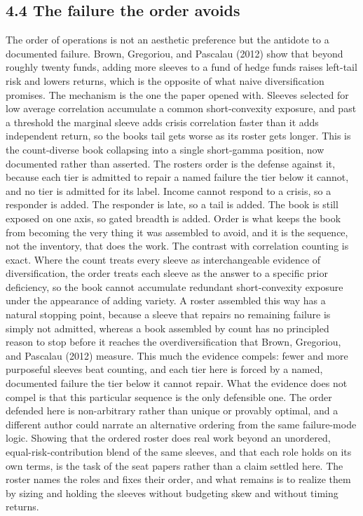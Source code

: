 \documentclass[12pt, a4paper]{article}
\begin{document}
\subsection*{4.4 The failure the order
avoids}\label{the-failure-the-order-avoids}

The order of operations is not an aesthetic preference but the antidote
to a documented failure. Brown, Gregoriou, and Pascalau (2012) show that
beyond roughly twenty funds, adding more sleeves to a fund of hedge
funds raises left-tail risk and lowers returns, which is the opposite of
what naive diversification promises. The mechanism is the one the paper
opened with. Sleeves selected for low average correlation accumulate a
common short-convexity exposure, and past a threshold the marginal
sleeve adds crisis correlation faster than it adds independent return,
so the book\textquotesingle s tail gets worse as its roster gets longer.
This is the count-diverse book collapsing into a single short-gamma
position, now documented rather than asserted. The
roster\textquotesingle s order is the defense against it, because each
tier is admitted to repair a named failure the tier below it cannot, and
no tier is admitted for its label. Income cannot respond to a crisis, so
a responder is added. The responder is late, so a tail is added. The
book is still exposed on one axis, so gated breadth is added. Order is
what keeps the book from becoming the very thing it was assembled to
avoid, and it is the sequence, not the inventory, that does the work.
The contrast with correlation counting is exact. Where the count treats
every sleeve as interchangeable evidence of diversification, the order
treats each sleeve as the answer to a specific prior deficiency, so the
book cannot accumulate redundant short-convexity exposure under the
appearance of adding variety. A roster assembled this way has a natural
stopping point, because a sleeve that repairs no remaining failure is
simply not admitted, whereas a book assembled by count has no principled
reason to stop before it reaches the overdiversification that Brown,
Gregoriou, and Pascalau (2012) measure. This much the evidence compels:
fewer and more purposeful sleeves beat counting, and each tier here is
forced by a named, documented failure the tier below it cannot repair.
What the evidence does not compel is that this particular sequence is
the only defensible one. The order defended here is non-arbitrary rather
than unique or provably optimal, and a different author could narrate an
alternative ordering from the same failure-mode logic. Showing that the
ordered roster does real work beyond an unordered,
equal-risk-contribution blend of the same sleeves, and that each role
holds on its own terms, is the task of the seat papers rather than a
claim settled here. The roster names the roles and fixes their order,
and what remains is to realize them by sizing and holding the sleeves
without budgeting skew and without timing returns.
\end{document}
